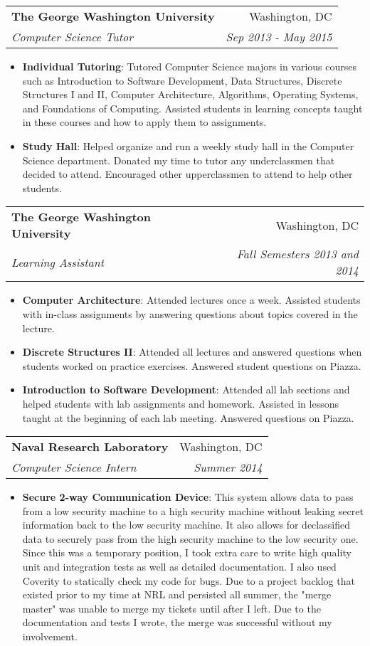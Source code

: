 \documentclass[letterpaper,11pt]{article}
\makeatletter
\newcommand{\resumeItem}[2]{
  \item\small{
    \textbf{#1}{: #2 \vspace{-2pt}}
  }
}
\newcommand{\resumeSubheading}[4]{
  \vspace{-1pt}\item
    \begin{tabular*}{0.97\textwidth}{l@{\extracolsep{\fill}}r}
      \textbf{#1} & #2 \\
      \textit{\small#3} & \textit{\small #4} \\
    \end{tabular*}\vspace{-5pt}
}
\newcommand{\resumeItemListStart}{\begin{itemize}}
\newcommand{\resumeItemListEnd}{\end{itemize}\vspace{-5pt}}
\makeatother
\begin{document}
    \resumeSubheading
      {The George Washington University}{Washington, DC}
      {Computer Science Tutor}{Sep 2013 - May 2015}
      \resumeItemListStart
        \resumeItem{Individual Tutoring}
          {Tutored Computer Science majors in various courses such as Introduction to Software Development, Data Structures, Discrete Structures I and II, Computer Architecture, Algorithms, Operating Systems, and Foundations of Computing. Assisted students in learning concepts taught in these courses and how to apply them to assignments.}
        \resumeItem{Study Hall}
          {Helped organize and run a weekly study hall in the Computer Science department. Donated my time to tutor any underclassmen that decided to attend. Encouraged other upperclassmen to attend to help other students.}
      \resumeItemListEnd
    
    \resumeSubheading
        {The George Washington University}{Washington, DC}
        {Learning Assistant}{Fall Semesters 2013 and 2014}
        \resumeItemListStart
            \resumeItem{Computer Architecture}
                {Attended lectures once a week. Assisted students with in-class assignments by answering questions about topics covered in the lecture.}
            \resumeItem{Discrete Structures II}
                {Attended all lectures and answered questions when students worked on practice exercises. Answered student questions on Piazza.}
            \resumeItem{Introduction to Software Development}
                {Attended all lab sections and helped students with lab assignments and homework. Assisted in lessons taught at the beginning of each lab meeting. Answered questions on Piazza.}
        \resumeItemListEnd
    
    \resumeSubheading
        {Naval Research Laboratory}{Washington, DC}
        {Computer Science Intern}{Summer 2014}
        \resumeItemListStart
            \resumeItem{Secure 2-way Communication Device}
                {This system allows data to pass from a low security machine to a high security machine without leaking secret information back to the low security machine. It also allows for declassified data to securely pass from the high security machine to the low security one. Since this was a temporary position, I took extra care to write high quality unit and integration tests as well as detailed documentation. I also used Coverity to statically check my code for bugs. Due to a project backlog that existed prior to my time at NRL and persisted all summer, the "merge master" was unable to merge my tickets until after I left. Due to the documentation and tests I wrote, the merge was successful without my involvement.}
        \resumeItemListEnd
    
\end{document}
